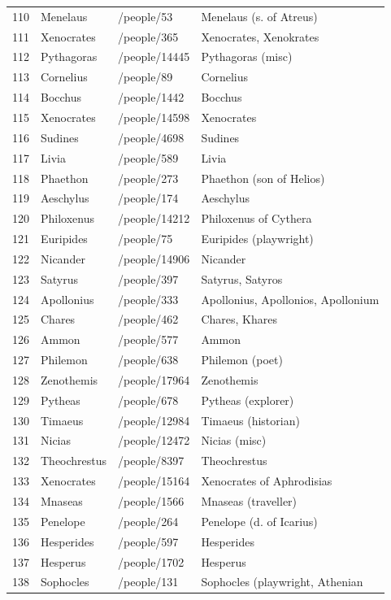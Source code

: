 \documentclass[
  12pt,
]{article}
\begin{document}
\begin{longtable}[]{@{}llll@{}}
110 & Menelaus & /people/53 & Menelaus (s. of Atreus) \\
111 & Xenocrates & /people/365 & Xenocrates, Xenokrates \\
112 & Pythagoras & /people/14445 & Pythagoras (misc) \\
113 & Cornelius & /people/89 & Cornelius \\
114 & Bocchus & /people/1442 & Bocchus \\
115 & Xenocrates & /people/14598 & Xenocrates \\
116 & Sudines & /people/4698 & Sudines \\
117 & Livia & /people/589 & Livia \\
118 & Phaethon & /people/273 & Phaethon (son of Helios) \\
119 & Aeschylus & /people/174 & Aeschylus \\
120 & Philoxenus & /people/14212 & Philoxenus of Cythera \\
121 & Euripides & /people/75 & Euripides (playwright) \\
122 & Nicander & /people/14906 & Nicander \\
123 & Satyrus & /people/397 & Satyrus, Satyros \\
124 & Apollonius & /people/333 & Apollonius, Apollonios, Apollonium \\
125 & Chares & /people/462 & Chares, Khares \\
126 & Ammon & /people/577 & Ammon \\
127 & Philemon & /people/638 & Philemon (poet) \\
128 & Zenothemis & /people/17964 & Zenothemis \\
129 & Pytheas & /people/678 & Pytheas (explorer) \\
130 & Timaeus & /people/12984 & Timaeus (historian) \\
131 & Nicias & /people/12472 & Nicias (misc) \\
132 & Theochrestus & /people/8397 & Theochrestus \\
133 & Xenocrates & /people/15164 & Xenocrates of Aphrodisias \\
134 & Mnaseas & /people/1566 & Mnaseas (traveller) \\
135 & Penelope & /people/264 & Penelope (d. of Icarius) \\
136 & Hesperides & /people/597 & Hesperides \\
137 & Hesperus & /people/1702 & Hesperus \\
138 & Sophocles & /people/131 & Sophocles (playwright, Athenian

\end{longtable}
\end{document}
